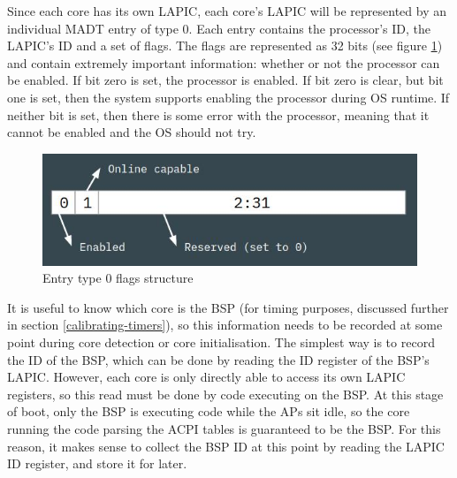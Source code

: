 \documentclass[bsc,frontabs,twoside,singlespacing,parskip,deptreport]{infthesis}     %
\begin{document}
Since each core has its own LAPIC, each core's LAPIC will be represented by an individual MADT entry of type 0. Each entry contains the processor's ID, the LAPIC's ID and a set of flags. The flags are represented as 32 bits (see figure \ref{entry0flags}) and contain extremely important information: whether or not the processor can be enabled. If bit zero is set, the processor is enabled. If bit zero is clear, but bit one is set, then the system supports enabling the processor during OS runtime. If neither bit is set, then there is some error with the processor, meaning that it cannot be enabled and the OS should not try.

\begin{figure}[h]
    \centering
    \includegraphics[scale=0.6]{figures/entry0flags.jpg}
    \caption{Entry type 0 flags structure}
    \label{entry0flags}
\end{figure}

It is useful to know which core is the BSP (for timing purposes, discussed further in section \ref{calibrating-timers}), so this information needs to be recorded at some point during core detection or core initialisation. The simplest way is to record the ID of the BSP, which can be done by reading the ID register of the BSP's LAPIC. However, each core is only directly able to access its own LAPIC registers, so this read must be done by code executing on the BSP. At this stage of boot, only the BSP is executing code while the APs sit idle, so the core running the code parsing the ACPI tables is guaranteed to be the BSP. For this reason, it makes sense to collect the BSP ID at this point by reading the LAPIC ID register, and store it for later.
\end{document}

